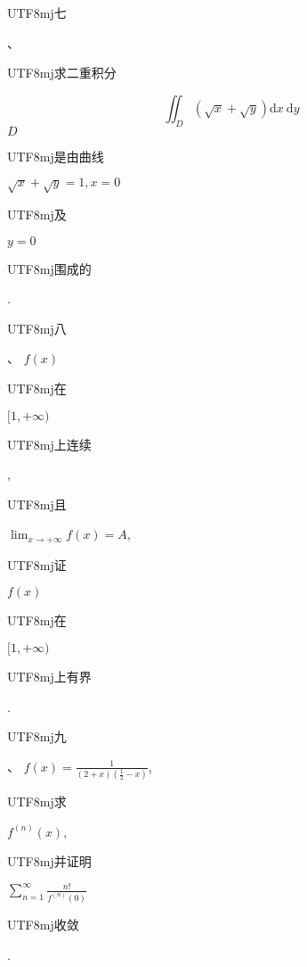 \documentclass[10pt]{article}
\begin{document}
\begin{CJK}{UTF8}{mj}七\end{CJK}、\begin{CJK}{UTF8}{mj}求二重积分\end{CJK}
$$
\iint_{D}(\sqrt{x}+\sqrt{y}) \mathrm{d} x \mathrm{~d} y
$$
$D$ \begin{CJK}{UTF8}{mj}是由曲线\end{CJK} $\sqrt{x}+\sqrt{y}=1, x=0$ \begin{CJK}{UTF8}{mj}及\end{CJK} $y=0$ \begin{CJK}{UTF8}{mj}围成的\end{CJK}.

\begin{CJK}{UTF8}{mj}八\end{CJK}、 $f(x)$ \begin{CJK}{UTF8}{mj}在\end{CJK} $[1,+\infty)$ \begin{CJK}{UTF8}{mj}上连续\end{CJK}, \begin{CJK}{UTF8}{mj}且\end{CJK} $\lim _{x \rightarrow+\infty} f(x)=A$, \begin{CJK}{UTF8}{mj}证\end{CJK} $f(x)$ \begin{CJK}{UTF8}{mj}在\end{CJK} $[1,+\infty)$ \begin{CJK}{UTF8}{mj}上有界\end{CJK}.

\begin{CJK}{UTF8}{mj}九\end{CJK}、 $f(x)=\frac{1}{(2+x)\left(\frac{1}{2}-x\right)}$, \begin{CJK}{UTF8}{mj}求\end{CJK} $f^{(n)}(x)$, \begin{CJK}{UTF8}{mj}并证明\end{CJK} $\sum_{n=1}^{\infty} \frac{n !}{f^{(n)}(0)}$ \begin{CJK}{UTF8}{mj}收敛\end{CJK}.
\end{document}
